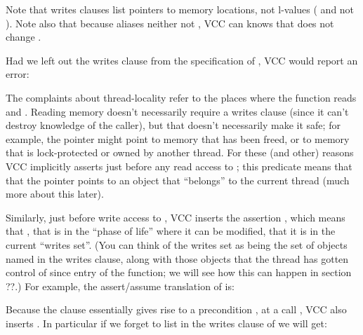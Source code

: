 Note that writes clauses list pointers to memory locations, not l-values
(\ie {} and not ).
Note also that because  aliases neither  not , VCC can
knows that  does not change .

Had we left out the writes clause from the specification of
, VCC would report an error:


\noindent
{}
The complaints about thread-locality refer to the places where the function
reads  and . Reading memory doesn't necessarily require
a writes clause (since it can't destroy knowledge of the caller),
but that doesn't necessarily make it safe; for example, the pointer might point
to memory that has been freed, or to memory that is lock-protected or owned
by another thread. For these (and other) reasons VCC implicitly
asserts  just before any read access to ;
this predicate means that that the pointer points to an object that
``belongs'' to the current thread (much more about this later).

Similarly, just before write access to , VCC inserts the
assertion , which means that ,
that  is in the ``phase of life'' where it can be modified,
that it  is in the current ``writes set''. (You can think of
the writes set as being the set of objects named in the writes clause,
along with those objects that the thread has gotten control of since
entry of the function; we will see how this can happen in section ??.)
For example, the assert/assume translation of  is:


\noindent
Because the clause  essentially gives rise to a precondition
, at a call  ,
VCC also inserts .
In particular if we forget to list  in the writes
clause of  we will get:






